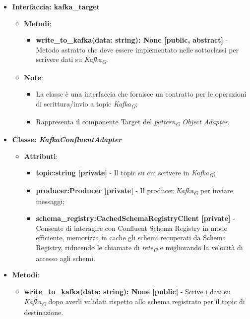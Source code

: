 \begin{itemize}
\begin{itemize}
    \end{itemize}
    \item{\textbf{Interfaccia: kafka\_target}}
    \begin{itemize}
        \item \textbf{Metodi}:
        \begin{itemize}
            \item \textbf{write\_to\_kafka(data: string): None [public, abstract]} - Metodo astratto che deve essere implementato nelle sottoclassi per scrivere dati su \textit{Kafka}\textsubscript{\textit{G}}.
        \end{itemize}
        \item\textbf{Note}:
        \begin{itemize}
            \item La classe è una interfaccia che fornisce un contratto per le operazioni di scrittura/invio a topic \textit{Kafka}\textsubscript{\textit{G}};
            \item Rappresenta il componente Target del \textit{pattern}\textsubscript{\textit{G}} \textit{Object Adapter}.
        \end{itemize}
    \end{itemize}
    \item{\textbf{Classe: \textit{KafkaConfluentAdapter}}}
    \begin{itemize}
        \item\textbf{Attributi}:
        \begin{itemize}
            \item \textbf{topic:string [private]} - Il topic su cui scrivere in \textit{Kafka}\textsubscript{\textit{G}};
            \item \textbf{producer:Producer [private]} - Il producer \textit{Kafka}\textsubscript{\textit{G}} per inviare messaggi;
            \item \textbf{schema\_registry:CachedSchemaRegistryClient [private]} - Consente di interagire con Confluent Schema Registry in modo efficiente, memorizza in cache gli schemi recuperati da Schema Registry, riducendo le chiamate di \textit{rete}\textsubscript{\textit{G}} e migliorando la velocità di accesso agli schemi.
        \end{itemize}
    \end{itemize}
    \item \textbf{Metodi}:
    \begin{itemize}
        \item \textbf{write\_to\_kafka(data: string): None [public]} - Scrive i dati su \textit{Kafka}\textsubscript{\textit{G}} dopo averli validati rispetto allo schema registrato per il topic di destinazione.

\end{itemize}
\end{itemize}
